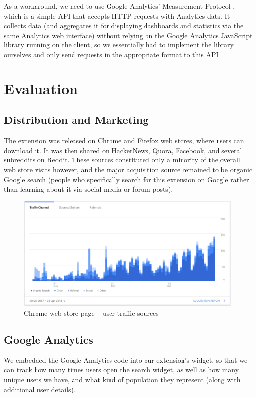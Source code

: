 \documentclass[bsc,frontabs,twoside,singlespacing,parskip,deptreport]{infthesis}
\begin{document}
As a workaround, we need to use Google Analytics' Measurement Protocol \cite{A21}, which is a simple API that accepts HTTP requests with Analytics data. It collects data (and aggregates it for displaying dashboards and statistics via the same Analytics web interface) without relying on the Google Analytics JavaScript library running on the client, so we essentially had to implement the library ourselves and only send requests in the appropriate format to this API.

\chapter{Evaluation}
\section{Distribution and Marketing}
The extension was released on Chrome and Firefox web stores, where users can download it. It was then shared on HackerNews, Quora, Facebook, and several subreddits on Reddit. These sources constituted only a minority of the overall web store visits however, and the major acquisition source remained to be organic Google search (people who specifically search for this extension on Google rather than learning about it via social media or forum posts).

\begin{figure}[h]
\centering
\includegraphics[width=0.99\textwidth]{../docs/user-acquisition.png}
\caption{Chrome web store page -- user traffic sources}
\end{figure}

\section{Google Analytics}
We embedded the Google Analytics code into our extension's widget, so that we can track how many times users open the search widget, as well as how many unique users we have, and what kind of population they represent (along with additional user details).
\end{document}
